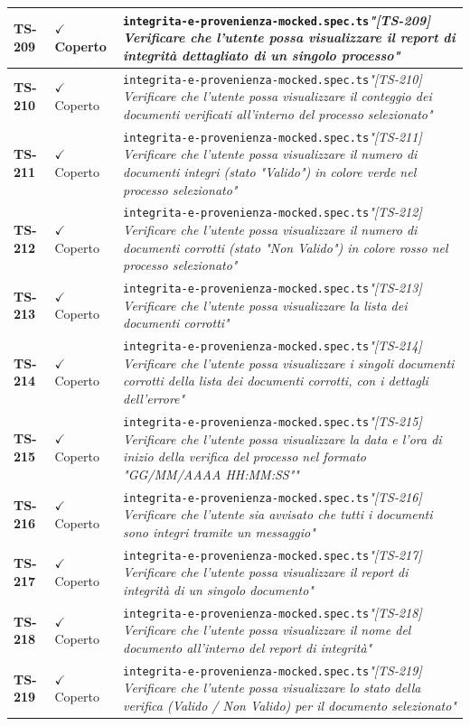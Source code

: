 \documentclass[a4paper,12pt]{article}
\newcommand{\ok}{\textcolor{green!60!black}{$\checkmark$ Coperto}}
\newcommand{\f}[1]{\nolinkurl{#1}\newline}
\newcommand{\q}[1]{\textit{#1}}
\begin{document}
\begin{longtable}{|p{1.5cm}|p{3.0cm}|p{10.5cm}|}
\textbf{TS-209} & \ok & \f{integrita-e-provenienza-mocked.spec.ts}\q{"[TS-209] Verificare che l'utente possa visualizzare il report di integrità dettagliato di un singolo processo"} \\ \hline
\textbf{TS-210} & \ok & \f{integrita-e-provenienza-mocked.spec.ts}\q{"[TS-210] Verificare che l'utente possa visualizzare il conteggio dei documenti verificati all'interno del processo selezionato"} \\ \hline
\textbf{TS-211} & \ok & \f{integrita-e-provenienza-mocked.spec.ts}\q{"[TS-211] Verificare che l'utente possa visualizzare il numero di documenti integri (stato "Valido") in colore verde nel processo selezionato"} \\ \hline
\textbf{TS-212} & \ok & \f{integrita-e-provenienza-mocked.spec.ts}\q{"[TS-212] Verificare che l'utente possa visualizzare il numero di documenti corrotti (stato "Non Valido") in colore rosso nel processo selezionato"} \\ \hline
\textbf{TS-213} & \ok & \f{integrita-e-provenienza-mocked.spec.ts}\q{"[TS-213] Verificare che l'utente possa visualizzare la lista dei documenti corrotti"} \\ \hline
\textbf{TS-214} & \ok & \f{integrita-e-provenienza-mocked.spec.ts}\q{"[TS-214] Verificare che l'utente possa visualizzare i singoli documenti corrotti della lista dei documenti corrotti, con i dettagli dell'errore"} \\ \hline
\textbf{TS-215} & \ok & \f{integrita-e-provenienza-mocked.spec.ts}\q{"[TS-215] Verificare che l'utente possa visualizzare la data e l'ora di inizio della verifica del processo nel formato "GG/MM/AAAA HH:MM:SS""} \\ \hline
\textbf{TS-216} & \ok & \f{integrita-e-provenienza-mocked.spec.ts}\q{"[TS-216] Verificare che l'utente sia avvisato che tutti i documenti sono integri tramite un messaggio"} \\ \hline
\textbf{TS-217} & \ok & \f{integrita-e-provenienza-mocked.spec.ts}\q{"[TS-217] Verificare che l'utente possa visualizzare il report di integrità di un singolo documento"} \\ \hline
\textbf{TS-218} & \ok & \f{integrita-e-provenienza-mocked.spec.ts}\q{"[TS-218] Verificare che l'utente possa visualizzare il nome del documento all'interno del report di integrità"} \\ \hline
\textbf{TS-219} & \ok & \f{integrita-e-provenienza-mocked.spec.ts}\q{"[TS-219] Verificare che l'utente possa visualizzare lo stato della verifica (Valido / Non Valido) per il documento selezionato"} \\ \hline

\end{longtable}
\end{document}
